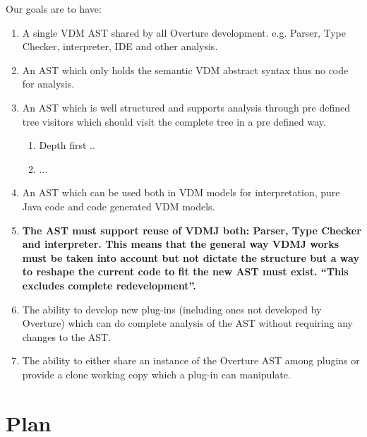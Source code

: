 \documentclass{overturerep}
\begin{document}
Our goals are to have:
\begin{enumerate}
\item A single VDM AST shared by all Overture development. e.g. Parser, Type Checker, interpreter, IDE and other analysis.
\item An AST which only holds the semantic VDM abstract syntax thus no code for analysis.
\item An AST which is well structured and supports analysis through pre defined tree visitors which should visit the complete tree in a pre defined way.
\begin{enumerate}
\item Depth first ..
\item ...
\end{enumerate}
\item An AST which can be used both in VDM models for interpretation, pure Java code and code generated VDM models.

\item \textbf{The AST must support reuse of VDMJ both: Parser, Type Checker and interpreter. This means that the general way VDMJ works must be taken into account but not dictate the structure but a way to reshape the current code to fit the new AST must exist. ``This excludes complete redevelopment''.}
\item The ability to develop new plug-ins (including ones not developed by Overture) which can do complete analysis of the AST without requiring any changes to the AST.
\item The ability to either share an instance of the Overture AST among plugins or provide a clone working copy which a plug-in can manipulate.
\end{enumerate}

\section{Plan}
\end{document}

